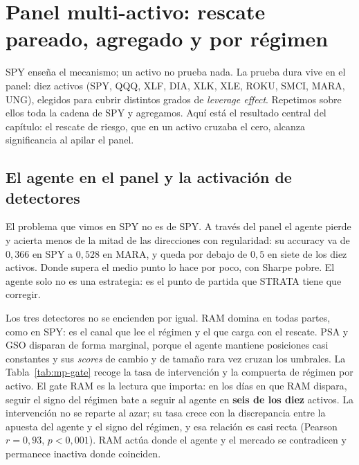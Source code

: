 \section{Panel multi-activo: rescate pareado, agregado y por régimen}
\label{sec:mp-panel}


SPY enseña el mecanismo; un activo no prueba nada. La prueba dura vive en el panel: diez activos (SPY, QQQ, XLF, DIA, XLK, XLE, ROKU, SMCI, MARA, UNG), elegidos para cubrir distintos grados de \emph{leverage effect}. Repetimos sobre ellos toda la cadena de SPY y agregamos. Aquí está el resultado central del capítulo: el rescate de riesgo, que en un activo cruzaba el cero, alcanza significancia al apilar el panel.

\subsection{El agente en el panel y la activación de detectores}
\label{sec:mp-panel-agente}

El problema que vimos en SPY no es de SPY. A través del panel el agente pierde y acierta menos de la mitad de las direcciones con regularidad: su accuracy va de $0{,}366$ en SPY a $0{,}528$ en MARA, y queda por debajo de $0{,}5$ en siete de los diez activos. Donde supera el medio punto lo hace por poco, con Sharpe pobre. El agente solo no es una estrategia: es el punto de partida que STRATA tiene que corregir.

Los tres detectores no se encienden por igual. RAM domina en todas partes, como en SPY: es el canal que lee el régimen y el que carga con el rescate. PSA y GSO disparan de forma marginal, porque el agente mantiene posiciones casi constantes y sus \emph{scores} de cambio y de tamaño rara vez cruzan los umbrales. La Tabla~\ref{tab:mp-gate} recoge la tasa de intervención y la compuerta de régimen por activo. El gate RAM es la lectura que importa: en los días en que RAM dispara, seguir el signo del régimen bate a seguir al agente en \textbf{seis de los diez} activos. La intervención no se reparte al azar; su tasa crece con la discrepancia entre la apuesta del agente y el signo del régimen, y esa relación es casi recta (Pearson $r = 0{,}93$, $p < 0{,}001$). RAM actúa donde el agente y el mercado se contradicen y permanece inactiva donde coinciden.

